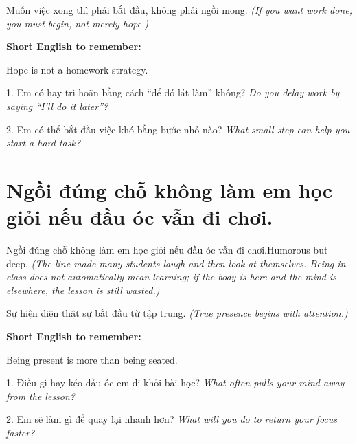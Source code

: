 \begin{baihoc}
Muốn việc xong thì phải bắt đầu, không phải ngồi mong.
\textit{(If you want work done, you must begin, not merely hope.)}
\end{baihoc}

\begin{ghinhoanh}
\textbf{Short English to remember:}

Hope is not a homework strategy.

\end{ghinhoanh}

\begin{tuhocnhanh}
1. Em có hay trì hoãn bằng cách “để đó lát làm” không? \textit{Do you delay work by saying “I'll do it later”?}

2. Em có thể bắt đầu việc khó bằng bước nhỏ nào? \textit{What small step can help you start a hard task?}
\end{tuhocnhanh}
\ngancach

\section{Ngồi đúng chỗ không làm em học giỏi nếu đầu óc vẫn đi chơi.}
\begin{truyen}{Ngồi đúng chỗ không làm em học giỏi nếu đầu óc vẫn đi chơi.}{Humorous but deep.}
\textit{(The line made many students laugh and then look at themselves. Being in class does not automatically mean learning; if the body is here and the mind is elsewhere, the lesson is still wasted.)}
\end{truyen}

\begin{baihoc}
Sự hiện diện thật sự bắt đầu từ tập trung.
\textit{(True presence begins with attention.)}
\end{baihoc}

\begin{ghinhoanh}
\textbf{Short English to remember:}

Being present is more than being seated.

\end{ghinhoanh}

\begin{tuhocnhanh}
1. Điều gì hay kéo đầu óc em đi khỏi bài học? \textit{What often pulls your mind away from the lesson?}

2. Em sẽ làm gì để quay lại nhanh hơn? \textit{What will you do to return your focus faster?}
\end{tuhocnhanh}
\ngancach

